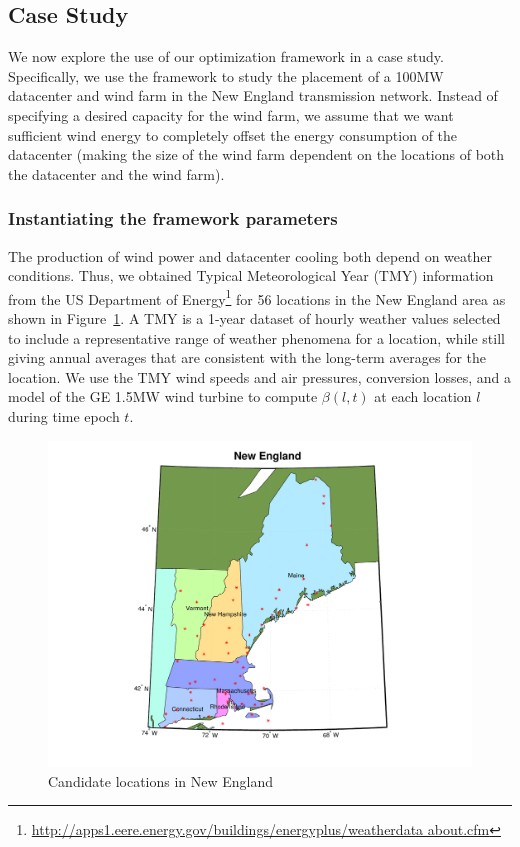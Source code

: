 \subsection{Case Study}
\label{sec:eval}

We now explore the use of our optimization framework in a case
study.  Specifically, we use the framework to study the placement of a 100MW
datacenter and wind farm in the New England transmission network.
Instead of specifying a desired capacity for the wind farm, we assume
that we want sufficient wind energy to completely offset the energy
consumption of the datacenter (making the size of the wind farm
dependent on the locations of both the datacenter and the wind farm).

\subsubsection{Instantiating the framework parameters}

The production of wind power and datacenter cooling both depend on
weather conditions.  Thus, we obtained Typical Meteorological Year
(TMY) information from the US Department of
Energy\footnote{\url{http://apps1.eere.energy.gov/buildings/energyplus/weatherdata
    about.cfm}} for 56 locations in the New England area as shown in
Figure~\ref{fig:NE_locs}.  A TMY is a 1-year dataset of hourly weather
values selected to include a representative range of weather phenomena
for a location, while still giving annual averages that are consistent
with the long-term averages for the location.
We use the TMY wind speeds and air pressures,
conversion losses, and a model of the GE 1.5MW wind
turbine \cite{lei2006modeling} to compute
$\beta(l,t)$ at each location $l$ during time epoch $t$. 

\begin{figure}[ht]
\centering
\includegraphics[width=\columnwidth]{img/NE_map}
\vspace{-0.35in}
\caption{Candidate locations in New England}
\label{fig:NE_locs}
\end{figure}

